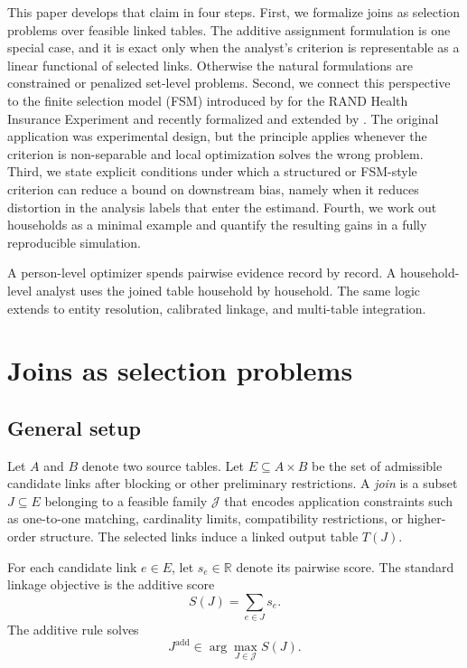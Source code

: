\documentclass[11pt]{article}
\theoremstyle{remark}
\begin{document}
This paper develops that claim in four steps. First, we formalize joins as selection problems over feasible linked tables. The additive assignment formulation is one special case, and it is exact only when the analyst's criterion is representable as a linear functional of selected links. Otherwise the natural formulations are constrained or penalized set-level problems. Second, we connect this perspective to the finite selection model (FSM) introduced by \citet{Morris1979} for the RAND Health Insurance Experiment and recently formalized and extended by \citet{Chattopadhyay2026}. The original application was experimental design, but the principle applies whenever the criterion is non-separable and local optimization solves the wrong problem. Third, we state explicit conditions under which a structured or FSM-style criterion can reduce a bound on downstream bias, namely when it reduces distortion in the analysis labels that enter the estimand. Fourth, we work out households as a minimal example and quantify the resulting gains in a fully reproducible simulation.

A person-level optimizer spends pairwise evidence record by record. A household-level analyst uses the joined table household by household. The same logic extends to entity resolution, calibrated linkage, and multi-table integration.

\section{Joins as selection problems}
\label{sec:selection}

\subsection{General setup}

Let $A$ and $B$ denote two source tables. Let $E\subseteq A\times B$ be the set of admissible candidate links after blocking or other preliminary restrictions. A \emph{join} is a subset $J\subseteq E$ belonging to a feasible family $\mathcal{J}$ that encodes application constraints such as one-to-one matching, cardinality limits, compatibility restrictions, or higher-order structure. The selected links induce a linked output table $T(J)$.

For each candidate link $e\in E$, let $s_e\in\mathbb{R}$ denote its pairwise score. The standard linkage objective is the additive score
\begin{equation}
S(J)=\sum_{e\in J} s_e.
\label{eq:additive-score-general}
\end{equation}
The additive rule solves
\begin{equation}
J^{\mathrm{add}}\in\arg\max_{J\in\mathcal{J}} S(J).
\label{eq:additive-problem-general}
\end{equation}
\end{document}

